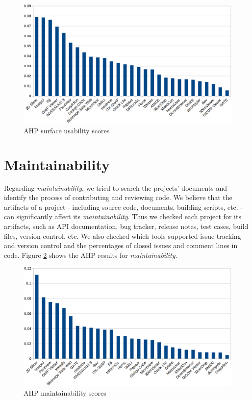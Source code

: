 \begin{figure}[H]
\includegraphics[scale=0.38]{figures/usability_scores.png}
\caption{AHP surface usability scores}
\label{fg_usability_scores}
\end{figure}

\section{Maintainability}

Regarding \textit{maintainability}, we tried to search the projects' documents and identify the process of contributing and reviewing code. We believe that the artifacts of a project - including source code, documents, building scripts, etc. - can significantly affect its  \textit{maintainability}. Thus we checked each project for its artifacts, such as API documentation, bug tracker, release notes, test cases, build files, version control, etc. We also checked which tools supported issue tracking and version control and the percentages of closed issues and comment lines in code. Figure \ref{fg_maintainability_scores} shows the AHP results for \textit{maintainability}. 

\begin{figure}[H]
\includegraphics[scale=0.38]{figures/maintainability_scores.png}
\caption{AHP maintainability scores}
\label{fg_maintainability_scores}
\end{figure}


